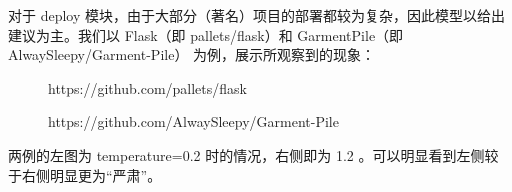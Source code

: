\documentclass{article}
\theoremstyle{plain}
\theoremstyle{definition}
\theoremstyle{remark}
\begin{document}
对于 deploy 模块，由于大部分（著名）项目的部署都较为复杂，因此模型以给出建议为主。我们以 Flask（即 pallets/flask）和 GarmentPile（即 AlwaySleepy/Garment-Pile） 为例，展示所观察到的现象：

\begin{figure}[H]
\centering
{}
\caption{https://github.com/pallets/flask}
\label{Fig.main}
\end{figure}

\begin{figure}[H]
\centering
{}
\caption{https://github.com/AlwaySleepy/Garment-Pile}
\label{Fig.main}
\end{figure}

两例的左图为 temperature=0.2 时的情况，右侧即为 1.2 。可以明显看到左侧较于右侧明显更为“严肃”。
\end{document}
